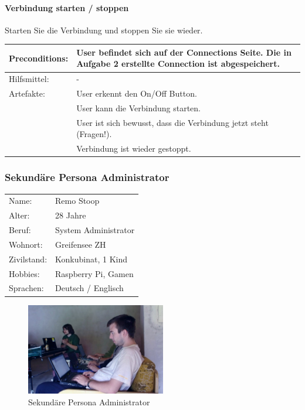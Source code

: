 \paragraph{Verbindung starten / stoppen}
Starten Sie die Verbindung und stoppen Sie sie wieder. \\


\begin{tabular}{ | p{} | p{} | }
\hline
Preconditions: & User befindet sich auf der Connections Seite. Die in Aufgabe 2 erstellte Connection ist abgespeichert. \\
\hline
Hilfsmittel: & - \\
\hline
Artefakte: & User erkennt den On/Off Button. \\
& User kann die Verbindung starten. \\
& User ist sich bewusst, dass die Verbindung jetzt steht (Fragen!). \\
& Verbindung ist wieder gestoppt. \\
\hline
\end{tabular}

\newpage
\subsubsection{Sekundäre Persona Administrator}

\noindent\begin{minipage}[t]{0.5\textwidth}
\vspace{0pt}
    \begin{tabular}{ l l }
        Name: & Remo Stoop \\
        Alter: & 28 Jahre \\
        Beruf: & System Administrator \\
        Wohnort: & Greifensee ZH \\
        Zivilstand: & Konkubinat, 1 Kind \\
        Hobbies: & Raspberry Pi, Gamen \\
        Sprachen: & Deutsch / Englisch \\
    \end{tabular}
\end{minipage}
\hfill
\begin{minipage}[t]{0.5\textwidth}
\vspace{0pt}
\begin{figure}[H]
\centering
    \includegraphics[width=230px]{images/administrator.jpg}
    \caption[Sekundäre Persona Administrator]{Sekundäre Persona Administrator}
\end{figure}
\end{minipage}



